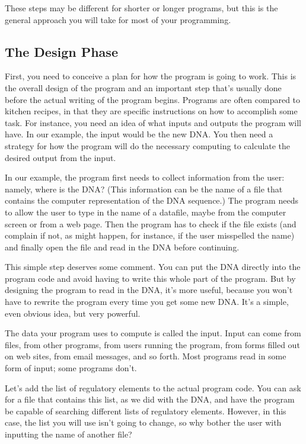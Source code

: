 These steps may be different for shorter or longer programs, but this is the general approach you will take for most of your programming.

\subsection{The Design Phase}
First, you need to conceive a plan for how the program is going to work. This is the overall design of the program and an important step that's usually done before the actual writing of the program begins. Programs are often compared to kitchen recipes, in that they are specific instructions on how to accomplish some task. For instance, you need an idea of what inputs and outputs the program will have. In our example, the input would be the new DNA. You then need a strategy for how the program will do the necessary computing to calculate the desired output from the input.

In our example, the program first needs to collect information from the user: namely, where is the DNA? (This information can be the name of a file that contains the computer representation of the DNA sequence.) The program needs to allow the user to type in the name of a datafile, maybe from the computer screen or from a web page. Then the program has to check if the file exists (and complain if not, as might happen, for instance, if the user misspelled the name) and finally open the file and read in the DNA before continuing.

This simple step deserves some comment. You can put the DNA directly into the program code and avoid having to write this whole part of the program. But by designing the program to read in the DNA, it's more useful, because you won't have to rewrite the program every time you get some new DNA. It's a simple, even obvious idea, but very powerful.

The data your program uses to compute is called the input. Input can come from files, from other programs, from users running the program, from forms filled out on web sites, from email messages, and so forth.  Most programs read in some form of input; some programs don't.

Let's add the list of regulatory elements to the actual program code. You can ask for a file that contains this list, as we did with the DNA, and have the program be capable of searching different lists of regulatory elements. However, in this case, the list you will use isn't going to change, so why bother the user with inputting the name of another file?

